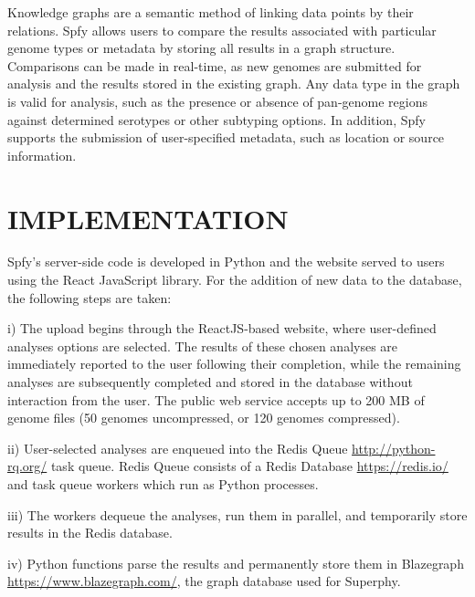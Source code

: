 \documentclass[a4,center,fleqn]{NAR}
\begin{document}

Knowledge graphs are a semantic method of linking data points by their relations. Spfy allows users to compare the results associated with particular genome types or metadata by storing all results in a graph structure. Comparisons can be made in real-time, as new genomes are submitted for analysis and the results stored in the existing graph. Any data type in the graph is valid for analysis, such as the presence or absence of pan-genome regions against determined serotypes or other subtyping options. In addition, Spfy supports the submission of user-specified metadata, such as location or source information.

\section{IMPLEMENTATION}
Spfy's server-side code is developed in Python and the website served to users using the React JavaScript library. For the addition of new data to the database, the following steps are taken:

i) The upload begins through the ReactJS-based website, where user-defined analyses options are selected. The results of these chosen analyses are immediately reported to the user following their completion, while the remaining analyses are subsequently completed and stored in the database without interaction from the user. The public web service accepts up to 200 MB of genome files (50 genomes uncompressed, or 120 genomes compressed).

ii) User-selected analyses are enqueued into the Redis Queue \url{http://python-rq.org/} task queue. Redis Queue consists of a Redis Database \url{https://redis.io/} and task queue workers which run as Python processes.

iii) The workers dequeue the analyses, run them in parallel, and temporarily store results in the Redis database.

iv) Python functions parse the results and permanently store them in Blazegraph \url{https://www.blazegraph.com/}, the graph database used for Superphy.
\end{document}

